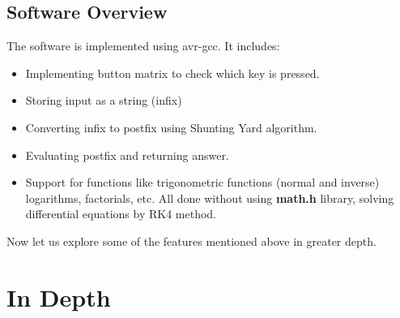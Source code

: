 \documentclass[a4paper,12pt]{article}
\begin{document}
\subsection*{Software Overview}
The software is implemented using avr-gcc. It includes:
\begin{itemize}
    \item Implementing button matrix to check which key is pressed.
    \item Storing input as a string (infix) 
    \item Converting infix to postfix using Shunting Yard algorithm.
    \item Evaluating postfix and returning answer.
    \item Support for functions like trigonometric functions (normal and inverse) logarithms, factorials, etc. All done without using \textbf{math.h} library, solving differential equations by RK4 method.
\end{itemize}
Now let us explore some of the features mentioned above in greater depth.
\section*{In Depth}
\end{document}
